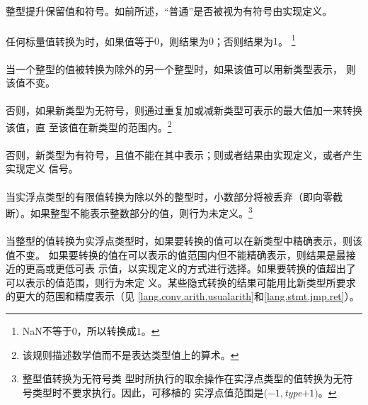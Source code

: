 {\paragraph{}
整型提升保留值和符号。如前所述，``普通''是否被视为有符号由实现定义。


\paragraph{}
任何标量值转换为时，如果值等于$0$，则结果为$0$；否则结果为$1$。
\footnote{NaN不等于$0$，所以转换成$1$。}

\paragraph{}
当一个整型的值被转换为除外的另一个整型时，如果该值可以用新类型表示，
则该值不变。

\paragraph{}
否则，如果新类型为无符号，则通过重复加或减新类型可表示的最大值加一来转换该值，直
至该值在新类型的范围内。\footnote{该规则描述数学值而不是表达类型值上的算术。}

\paragraph{}
否则，新类型为有符号，且值不能在其中表示；则或者结果由实现定义，或者产生实现定义
信号。

\paragraph{}
当实浮点类型的有限值转换为除以外的整型时，小数部分将被丢弃（即向零截
断）。如果整型不能表示整数部分的值，则行为未定义。\footnote{整型值转换为无符号类
型时所执行的取余操作在实浮点类型的值转换为无符号类型时不要求执行。因此，可移植的
实浮点值范围是$(-1,$\textit{type}$+1)$。}

\paragraph{}
当整型的值转换为实浮点类型时，如果要转换的值可以在新类型中精确表示，则该值不变。
如果要转换的值在可以表示的值范围内但不能精确表示，则结果是最接近的更高或更低可表
示值，以实现定义的方式进行选择。如果要转换的值超出了可以表示的值范围，则行为未定
义。某些隐式转换的结果可能用比新类型所要求的更大的范围和精度表示（见
\ref{lang.conv.arith.usualarith}和\ref{lang.stmt.jmp.ret}）。

}
